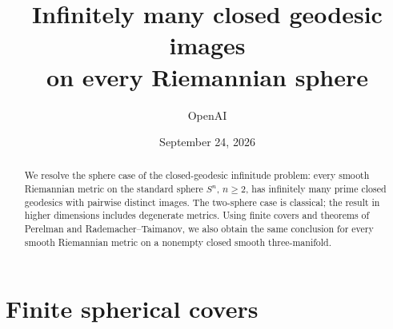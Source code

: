 \documentclass[11pt]{article}
\title{Infinitely many closed geodesic images\\on every Riemannian sphere}
\author{OpenAI}
\date{September 24, 2026}
\theoremstyle{definition}
\theoremstyle{remark}
\numberwithin{equation}{section}
\begin{document}
\maketitle
\begin{abstract}
We resolve the sphere case of the closed-geodesic infinitude problem:
every smooth Riemannian metric on the standard sphere $S^n$, $n\ge2$,
has infinitely many prime closed geodesics with pairwise distinct images.
The two-sphere case is classical; the result in higher dimensions includes
degenerate metrics. Using finite covers and theorems of Perelman and
Rademacher--Taimanov, we also obtain the same conclusion for every smooth
Riemannian metric on a nonempty closed smooth three-manifold.
\end{abstract}
\tableofcontents










\section{Finite spherical covers}\label{sec:covers}



\end{document}
